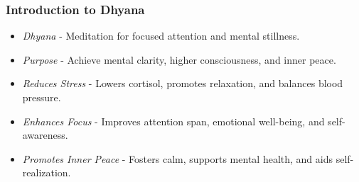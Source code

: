 


\begin{frame}[fragile]\frametitle{Introduction to Dhyana}
  \begin{itemize}
	\item \textit{Dhyana} - Meditation for focused attention and mental stillness.
	\item \textit{Purpose} - Achieve mental clarity, higher consciousness, and inner peace.
	\item \textit{Reduces Stress} - Lowers cortisol, promotes relaxation, and balances blood pressure.
	\item \textit{Enhances Focus} - Improves attention span, emotional well-being, and self-awareness.
	\item \textit{Promotes Inner Peace} - Fosters calm, supports mental health, and aids self-realization.
  \end{itemize}
\end{frame}